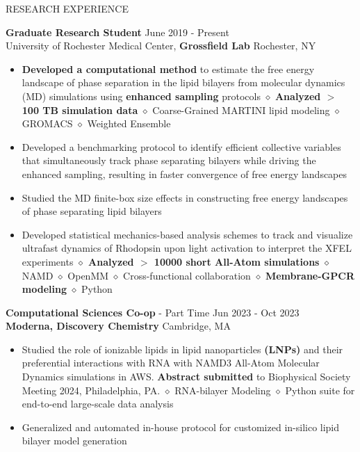 \documentclass{resume} %
\begin{document}
\begin{rSection}{RESEARCH EXPERIENCE}

   \textbf{Graduate Research Student} \hfill June 2019 - Present\\
   University of Rochester Medical Center, \textbf{Grossfield Lab} \hfill Rochester, NY
   \begin{itemize}
      \itemsep -1pt {}
      \item \textbf{Developed a computational method} to estimate the free energy landscape of phase separation in the lipid bilayers from molecular dynamics (MD) simulations using \textbf{enhanced sampling} protocols
            $\diamond$ \textbf{Analyzed $>$ 100 TB simulation data} $\diamond$ Coarse-Grained MARTINI lipid modeling $\diamond$ GROMACS $\diamond$ Weighted Ensemble
      \item Developed a benchmarking protocol to identify efficient collective variables that simultaneously track phase separating bilayers while driving the enhanced sampling, resulting in faster convergence of free energy landscapes
      \item Studied the MD finite-box size effects in constructing free energy landscapes of phase separating lipid bilayers
      \item Developed statistical mechanics-based analysis schemes to track and visualize ultrafast dynamics of Rhodopsin upon light activation to interpret the XFEL experiments \textbf{$\diamond$ Analyzed $>$ 10000 short All-Atom simulations}
            $\diamond$ NAMD $\diamond$ OpenMM $\diamond$ Cross-functional collaboration $\diamond$  \textbf{Membrane-GPCR modeling} $\diamond$ Python
   \end{itemize}

   \textbf{Computational Sciences Co-op} - Part Time \hfill Jun 2023 - Oct 2023\\
   \textbf{Moderna, Discovery Chemistry} \hfill {Cambridge, MA}
   \begin{itemize}
      \itemsep -1pt {}
      \item Studied the role of ionizable lipids in lipid nanoparticles \textbf{(LNPs)} and their preferential interactions with RNA with NAMD3 All-Atom Molecular Dynamics simulations in AWS.
            \textbf{Abstract submitted} to Biophysical Society Meeting 2024, Philadelphia, PA.
            $\diamond$ RNA-bilayer Modeling $\diamond$ Python suite for end-to-end large-scale data analysis
      \item Generalized and automated in-house protocol for customized in-silico lipid bilayer model generation
   \end{itemize}


\end{rSection}
\end{document}
